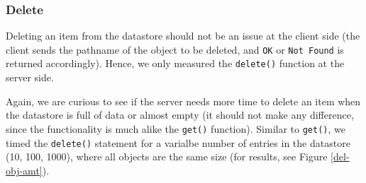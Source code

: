 

\subsubsection{Delete}
Deleting an item from the datastore should not be an issue at the client side
(the client sends the pathname of the object to be deleted, and \texttt{OK} or
\texttt{Not Found} is returned accordingly). Hence, we only measured the
\texttt{delete()} function at the server side. 

Again, we are curious to see if the server needs more time to delete an item
when the datastore is full of data or almost empty (it should not make any
difference, since the functionality is much alike the \texttt{get()} function).
Similar to \texttt{get()}, we timed the \texttt{delete()} statement for a
varialbe number of entries in the datastore (10, 100, 1000), where all objects
are the same size (for results, see Figure \ref{del-obj-amt}).

